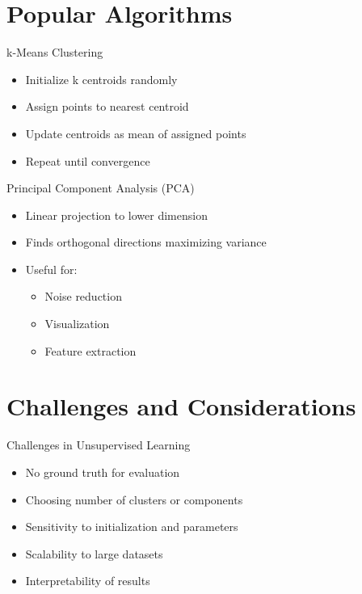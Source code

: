 \documentclass{beamer}
\begin{document}
\section{Popular Algorithms}

\begin{frame}{k-Means Clustering}
\begin{itemize}
    \item Initialize k centroids randomly
    \item Assign points to nearest centroid
    \item Update centroids as mean of assigned points
    \item Repeat until convergence
\end{itemize}
\end{frame}

\begin{frame}{Principal Component Analysis (PCA)}
\begin{itemize}
    \item Linear projection to lower dimension
    \item Finds orthogonal directions maximizing variance
    \item Useful for:
    \begin{itemize}
        \item Noise reduction
        \item Visualization
        \item Feature extraction
    \end{itemize}
\end{itemize}
\end{frame}

\section{Challenges and Considerations}

\begin{frame}{Challenges in Unsupervised Learning}
\begin{itemize}
    \item No ground truth for evaluation
    \item Choosing number of clusters or components
    \item Sensitivity to initialization and parameters
    \item Scalability to large datasets
    \item Interpretability of results
\end{itemize}
\end{frame}
\end{document}
